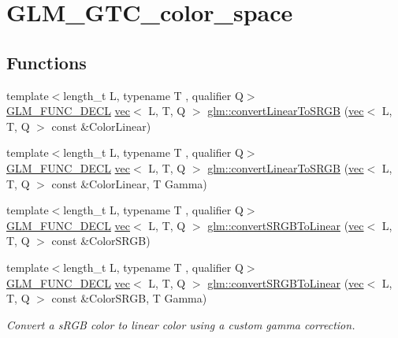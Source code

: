 \hypertarget{group__gtc__color__space}{}\section{G\+L\+M\+\_\+\+G\+T\+C\+\_\+color\+\_\+space}
\label{group__gtc__color__space}
\subsection*{Functions}
\begin{DoxyCompactItemize}
\item 
{\footnotesize template$<$length\+\_\+t L, typename T , qualifier Q$>$ }\\\mbox{\hyperlink{setup_8hpp_ab2d052de21a70539923e9bcbf6e83a51}{G\+L\+M\+\_\+\+F\+U\+N\+C\+\_\+\+D\+E\+CL}} \mbox{\hyperlink{structglm_1_1vec}{vec}}$<$ L, T, Q $>$ \mbox{\hyperlink{group__gtc__color__space_ga42239e7b3da900f7ef37cec7e2476579}{glm\+::convert\+Linear\+To\+S\+R\+GB}} (\mbox{\hyperlink{structglm_1_1vec}{vec}}$<$ L, T, Q $>$ const \&Color\+Linear)
\item 
{\footnotesize template$<$length\+\_\+t L, typename T , qualifier Q$>$ }\\\mbox{\hyperlink{setup_8hpp_ab2d052de21a70539923e9bcbf6e83a51}{G\+L\+M\+\_\+\+F\+U\+N\+C\+\_\+\+D\+E\+CL}} \mbox{\hyperlink{structglm_1_1vec}{vec}}$<$ L, T, Q $>$ \mbox{\hyperlink{group__gtc__color__space_gaace0a21167d13d26116c283009af57f6}{glm\+::convert\+Linear\+To\+S\+R\+GB}} (\mbox{\hyperlink{structglm_1_1vec}{vec}}$<$ L, T, Q $>$ const \&Color\+Linear, T Gamma)
\item 
{\footnotesize template$<$length\+\_\+t L, typename T , qualifier Q$>$ }\\\mbox{\hyperlink{setup_8hpp_ab2d052de21a70539923e9bcbf6e83a51}{G\+L\+M\+\_\+\+F\+U\+N\+C\+\_\+\+D\+E\+CL}} \mbox{\hyperlink{structglm_1_1vec}{vec}}$<$ L, T, Q $>$ \mbox{\hyperlink{group__gtc__color__space_ga16c798b7a226b2c3079dedc55083d187}{glm\+::convert\+S\+R\+G\+B\+To\+Linear}} (\mbox{\hyperlink{structglm_1_1vec}{vec}}$<$ L, T, Q $>$ const \&Color\+S\+R\+GB)
\item 
{\footnotesize template$<$length\+\_\+t L, typename T , qualifier Q$>$ }\\\mbox{\hyperlink{setup_8hpp_ab2d052de21a70539923e9bcbf6e83a51}{G\+L\+M\+\_\+\+F\+U\+N\+C\+\_\+\+D\+E\+CL}} \mbox{\hyperlink{structglm_1_1vec}{vec}}$<$ L, T, Q $>$ \mbox{\hyperlink{group__gtc__color__space_gad1b91f27a9726c9cb403f9fee6e2e200}{glm\+::convert\+S\+R\+G\+B\+To\+Linear}} (\mbox{\hyperlink{structglm_1_1vec}{vec}}$<$ L, T, Q $>$ const \&Color\+S\+R\+GB, T Gamma)
\begin{DoxyCompactList}\small\item\em Convert a s\+R\+GB color to linear color using a custom gamma correction. \end{DoxyCompactList}\end{DoxyCompactItemize}


